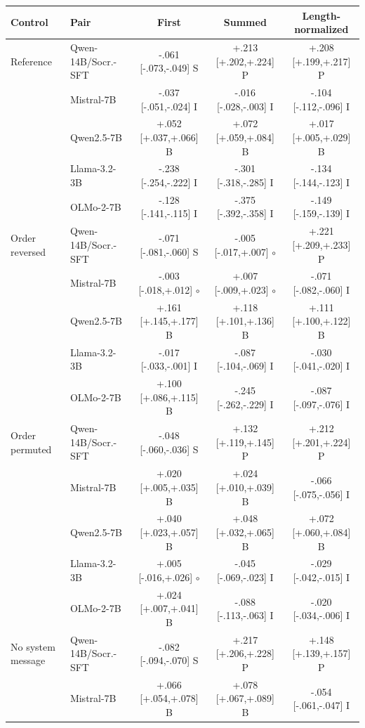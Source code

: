 \begin{table}[t]
\centering\scriptsize
\setlength{\tabcolsep}{3pt}
\begin{tabular}{@{}llccc@{}}
\toprule
Control & Pair & First & Summed & Length-normalized \\
\midrule
Reference & Qwen-14B/Socr.-SFT & -.061 [-.073,-.049] S & +.213 [+.202,+.224] P & +.208 [+.199,+.217] P \\
 & Mistral-7B & -.037 [-.051,-.024] I & -.016 [-.028,-.003] I & -.104 [-.112,-.096] I \\
 & Qwen2.5-7B & +.052 [+.037,+.066] B & +.072 [+.059,+.084] B & +.017 [+.005,+.029] B \\
 & Llama-3.2-3B & -.238 [-.254,-.222] I & -.301 [-.318,-.285] I & -.134 [-.144,-.123] I \\
 & OLMo-2-7B & -.128 [-.141,-.115] I & -.375 [-.392,-.358] I & -.149 [-.159,-.139] I \\
\addlinespace[1pt]
Order reversed & Qwen-14B/Socr.-SFT & -.071 [-.081,-.060] S & -.005 [-.017,+.007] $\circ$ & +.221 [+.209,+.233] P \\
 & Mistral-7B & -.003 [-.018,+.012] $\circ$ & +.007 [-.009,+.023] $\circ$ & -.071 [-.082,-.060] I \\
 & Qwen2.5-7B & +.161 [+.145,+.177] B & +.118 [+.101,+.136] B & +.111 [+.100,+.122] B \\
 & Llama-3.2-3B & -.017 [-.033,-.001] I & -.087 [-.104,-.069] I & -.030 [-.041,-.020] I \\
 & OLMo-2-7B & +.100 [+.086,+.115] B & -.245 [-.262,-.229] I & -.087 [-.097,-.076] I \\
\addlinespace[1pt]
Order permuted & Qwen-14B/Socr.-SFT & -.048 [-.060,-.036] S & +.132 [+.119,+.145] P & +.212 [+.201,+.224] P \\
 & Mistral-7B & +.020 [+.005,+.035] B & +.024 [+.010,+.039] B & -.066 [-.075,-.056] I \\
 & Qwen2.5-7B & +.040 [+.023,+.057] B & +.048 [+.032,+.065] B & +.072 [+.060,+.084] B \\
 & Llama-3.2-3B & +.005 [-.016,+.026] $\circ$ & -.045 [-.069,-.023] I & -.029 [-.042,-.015] I \\
 & OLMo-2-7B & +.024 [+.007,+.041] B & -.088 [-.113,-.063] I & -.020 [-.034,-.006] I \\
\addlinespace[1pt]
No system message & Qwen-14B/Socr.-SFT & -.082 [-.094,-.070] S & +.217 [+.206,+.228] P & +.148 [+.139,+.157] P \\
 & Mistral-7B & +.066 [+.054,+.078] B & +.078 [+.067,+.089] B & -.054 [-.061,-.047] I \\

\end{tabular}
\end{table}
